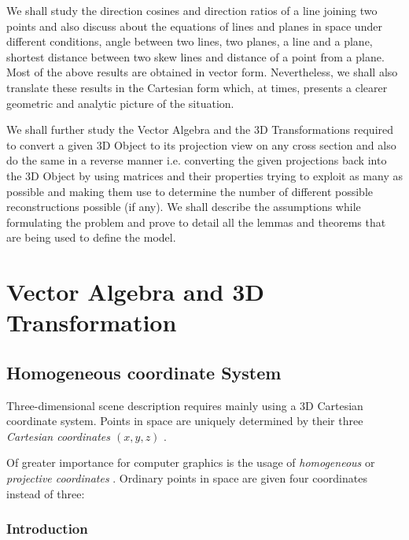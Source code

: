 \documentclass[12pt]{report}
\begin{document}
\vspace{0.5cm}

We shall study the direction cosines and direction ratios of a line joining two points and also discuss about the equations of lines and planes in space under different conditions, angle between two lines, two planes, a line and a plane, shortest distance between two skew lines and distance of a point from a plane. Most of the above results are obtained in vector form. Nevertheless, we shall also translate these results in the Cartesian form which, at times, presents a clearer geometric and analytic picture of the situation.
\\
\vspace{0.5cm}

We shall further study the Vector Algebra and the 3D Transformations required to convert a given 3D Object to its projection view on any cross section and also do the same in a reverse manner i.e. converting the given projections back into the 3D Object by using matrices and their properties trying to exploit as many as possible and making them use to determine the number of different possible reconstructions possible (if any). We shall describe the assumptions while formulating the problem and prove to detail all the lemmas and theorems that are being used to define the model.
\\

\chapter{Vector Algebra and 3D Transformation}

\section{Homogeneous coordinate System}

Three-dimensional scene description requires mainly using a 3D Cartesian coordinate system. Points in space are uniquely determined by their three \textit{ Cartesian coordinates $(x, y, z)$ } .

\vspace{0.5cm}
\noindent Of greater importance for computer graphics is the usage of \textit{ homogeneous} or \textit{projective coordinates }. Ordinary points in space are given four coordinates instead of three:


\subsection{Introduction}
\end{document}
